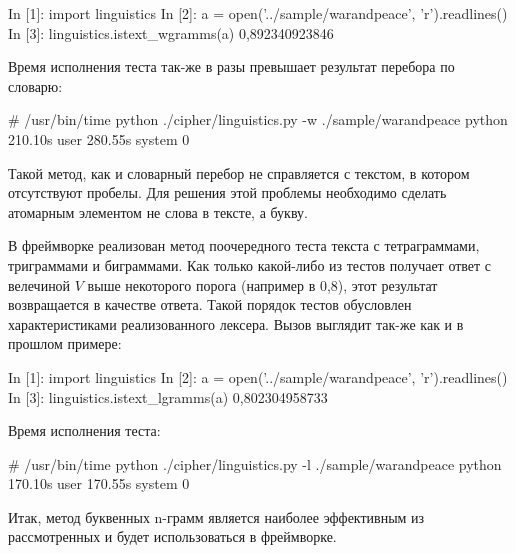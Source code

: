 \begin{listing}[1]{1}
In [1]: import linguistics
In [2]: a = open('../sample/warandpeace', 'r').readlines()
In [3]: linguistics.istext\_wgramms(a)
0,892340923846
\end{listing}

Время исполнения теста так-же в разы превышает результат 
перебора по словарю:

\begin{listing}[1]{1}
# /usr/bin/time python ./cipher/linguistics.py -w ./sample/warandpeace 
python  210.10s user 280.55s system 0%
\end{listing}

Такой метод, как и словарный перебор не справляется с 
текстом, в котором отсутствуют пробелы. Для решения 
этой проблемы необходимо сделать атомарным элементом 
не слова в тексте, а букву. 

В фреймворке реализован метод поочередного теста текста с 
тетраграммами, триграммами и биграммами. Как только какой-либо 
из тестов получает ответ с велечиной $V$ выше некоторого порога 
(например в 0,8), этот результат возвращается в качестве 
ответа. Такой порядок тестов обусловлен характеристиками 
реализованного лексера. Вызов выглядит так-же как и 
в прошлом примере: 

\begin{listing}[1]{1}
In [1]: import linguistics
In [2]: a = open('../sample/warandpeace', 'r').readlines()
In [3]: linguistics.istext\_lgramms(a)
0,802304958733
\end{listing}

Время исполнения теста:

\begin{listing}[1]{1}
# /usr/bin/time python ./cipher/linguistics.py -l ./sample/warandpeace 
python  170.10s user 170.55s system 0%
\end{listing}

Итак, метод буквенных n-грамм является наиболее эффективным
из рассмотренных и будет использоваться в фреймворке.
